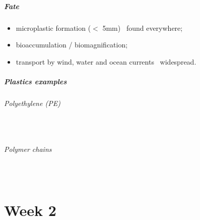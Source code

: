 \documentclass{article}
\newcommand{\pph}[1]{\paragraph{#1}\phantom{}\\}
\begin{document}
\subsubsection{Fate}
\begin{itemize}
    \item microplastic formation ($<$ 5mm) \textrightarrow\ found everywhere;
    \item bioaccumulation / biomagnification;
    \item transport by wind, water and ocean currents \textrightarrow\ widespread.
\end{itemize}

\subsubsection{Plastics examples}

\pph{Polyethylene (PE)}
\begin{center}
\end{center}

\pph{Polymer chains}

\newpage
\part{Week 2}
\end{document}
